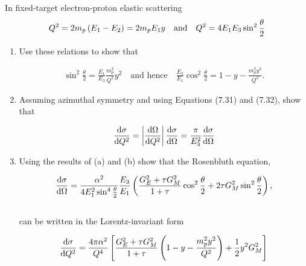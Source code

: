 \begin{problem}{8.2} 
In fixed-target electron-proton elastic scattering
\begin{align*}
    Q^2 = 2m_p \left(E_1-E_2\right) = 2m_p E_{1}y \quad \text{and} \quad Q^2 = 4E_1E_3 \sin^2 \frac{\theta}{2}
\end{align*}

\begin{enumerate}[label=(\alph*)]
    \item Use these relations to show that 

    \begin{align*}
        \sin^2\frac{\theta}{2} = \frac{E_1}{E_3} \frac{m_p^2}{Q^2} y^2 \quad \text{and hence} \quad \frac{E_3}{E_1}\cos^2\frac{\theta}{2} = 1-y - \frac{m_p^2 y^2}{Q^2}.
    \end{align*}

    \item Assuming azimuthal symmetry and using Equations (7.31) and (7.32), show that
    
    \begin{align*}
        \frac{\dif \sigma}{\dif Q^2} = \left|  \frac{\dif \Omega}{\dif Q^2} \right| \frac{\dif \sigma }{\dif \Omega} = \frac{\pi}{E_3^2} \frac{\dif\sigma}{\dif\Omega}
    \end{align*}

    \item Using the results of (a) and (b) show that the Rosenbluth equation,
    
    \begin{align*}
        \frac{\mathop{}\!\mathrm{d}\sigma}{\mathop{}\!\mathrm{d}\Omega} = \frac{\alpha^2}{4E_1^2 \sin^4\frac{\theta}{2}} \frac{E_3}{E_1} \left( \frac{G_E^2+\tau G_M^2}{1+\tau} \cos^2 \frac{\theta}{2} + 2\tau G_M^2 \sin^2\frac{\theta}{2} \right),
    \end{align*}\\
    can be written in the Lorentz-invariant form

    \begin{align*}
        \frac{\mathop{}\!\mathrm{d}\sigma}{\mathop{}\!\mathrm{d} Q^2} = \frac{4\pi\alpha^2}{Q^4} \left[ \frac{G_E^2 + \tau G_M^2}{1+\tau} \left( 1 - y - \frac{m_p^2 y^2}{Q^2} \right) + \frac{1}{2}y^2 G_M^2 \right]
    \end{align*}\\
\end{enumerate}
\end{problem}
